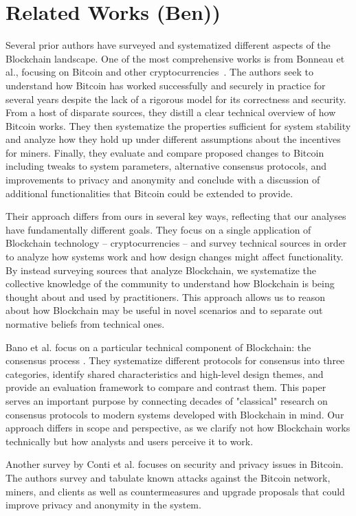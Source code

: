 
\section{Related Works (Ben))}
Several prior authors have surveyed and systematized different aspects of the Blockchain landscape.
One of the most comprehensive works is from Bonneau et al., focusing on Bitcoin and other cryptocurrencies~\cite{BMC+15}. The authors seek to understand how Bitcoin has worked successfully and securely in practice for several years despite the lack of a rigorous model for its correctness and security. From a host of disparate sources, they distill a clear technical overview of how Bitcoin works. They then systematize the properties sufficient for system stability and analyze how they hold up under different assumptions about the incentives for miners. Finally, they evaluate and compare proposed changes to Bitcoin including tweaks to system parameters, alternative consensus protocols, and improvements to privacy and anonymity and conclude with a discussion of additional functionalities that Bitcoin could be extended to provide.  

Their approach differs from ours in several key ways, reflecting that our analyses have fundamentally different goals. They focus on a single application of Blockchain technology -- cryptocurrencies -- and survey technical sources in order to analyze how systems work and how design changes might affect functionality. By instead surveying sources that analyze Blockchain, we systematize the collective knowledge of the community to understand how Blockchain is being thought about and used by practitioners. This approach allows us to reason about how Blockchain may be useful in novel scenarios and to separate out normative beliefs from technical ones. 

Bano et al. focus on a particular technical component of Blockchain: the consensus process \cite{Bano17}. They systematize different protocols for consensus into three categories, identify shared characteristics and high-level design themes, and provide an evaluation framework to compare and contrast them. This paper serves an important purpose by connecting decades of "classical" research on consensus protocols to modern systems developed with Blockchain in mind. Our approach differs in scope and perspective, as we clarify not how Blockchain works technically but how analysts and users perceive it to work.

Another survey by Conti et al. focuses on security and privacy issues in Bitcoin\cite{Conti17}. The authors survey and tabulate known attacks against the Bitcoin network, miners, and clients as well as countermeasures and upgrade proposals that could improve privacy and anonymity in the system.  

